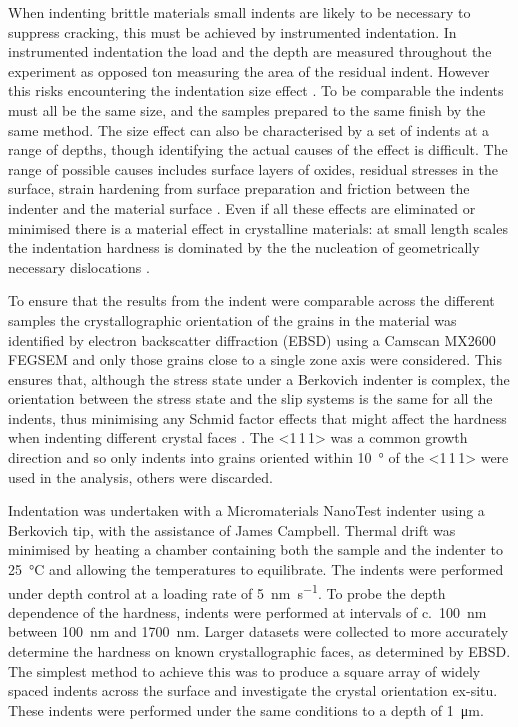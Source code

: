 When indenting brittle materials small indents are likely to be necessary to suppress cracking, this must be achieved by instrumented indentation. In instrumented indentation the load and the depth are measured throughout the experiment as opposed ton measuring the area of the residual indent. However this risks encountering the indentation size effect \cite{Korte2009,Cripps2011}. To be comparable the indents must all be the same size, and the samples prepared to the same finish by the same method. The size effect can also be characterised by a set of indents at a range of depths, though identifying the actual causes of the effect is difficult. The range of possible causes includes  surface layers of oxides, residual stresses in the surface, strain hardening from surface preparation and friction between the indenter and the material surface \cite{Cripps2011}. Even if all these effects are eliminated or minimised there is a material effect in crystalline materials: at small length scales the indentation hardness is dominated by the the nucleation of geometrically necessary dislocations \cite{Cripps2011}.






To ensure that the results from the indent were comparable across the different samples the crystallographic orientation of the grains in the material was identified by electron backscatter diffraction (EBSD) using a Camscan MX2600 FEGSEM and only those grains close to a single zone axis were considered. This ensures that, although the stress state under a Berkovich indenter is complex, the orientation between the stress state and the slip systems is the same for all the indents, thus minimising any Schmid factor effects that might affect the hardness when indenting different crystal faces \cite{Kelly2012ch7}. The <1\,1\,1> was a common growth direction and so only indents into grains oriented within \SI{10}{\degree} of the <1\,1\,1> were used in the analysis, others were discarded.


Indentation was undertaken with a Micromaterials NanoTest indenter using a Berkovich tip, with the assistance of James Campbell. Thermal drift was minimised by heating a chamber containing both the sample and the indenter to \SI{25}{\celsius} and allowing the temperatures to equilibrate. The indents were performed under depth control at a loading rate of \SI{5}{\nano\meter\per\second}. To probe the depth dependence of the hardness, indents were performed at intervals of c.~\SI{100}{\nano\meter} between \SI{100}{\nano\meter} and \SI{1700}{\nano\meter}. Larger datasets were collected to more accurately determine the hardness on known crystallographic faces, as determined by EBSD. The simplest method to achieve this was to produce a square array of widely spaced indents across the surface and investigate the crystal orientation ex-situ. These indents were performed under the same conditions to a depth of \SI{1}{\micro\meter}.

